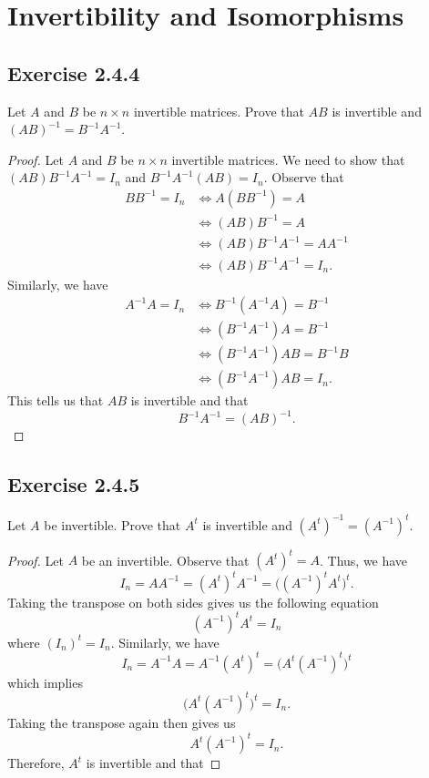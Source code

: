 \section{Invertibility and Isomorphisms}

\subsection*{Exercise 2.4.4} Let \( A  \) and \( B  \) be \( n \times n  \) invertible matrices. Prove that \( AB  \) is invertible and \( (AB)^{-1} = B^{-1} A^{-1} \).
\begin{proof}
Let \( A  \) and \( B  \) be \( n \times n  \) invertible matrices. We need to show that \( (AB)B^{-1}A^{-1} = {I}_{n} \) and \( B^{-1} A^{-1} (AB) = {I}_{n} \). Observe that
\begin{align*}
    B B^{-1} = {I}_{n}   &\iff A(B B^{-1}) = A   \\
                         &\iff  (AB) B^{-1} = A  \\
                         &\iff (AB) B^{-1}A^{-1} = A A^{-1} \\ 
                         &\iff (AB) B^{-1} A^{-1} = {I}_{n}.
\end{align*}
Similarly, we have 
\begin{align*}
     A^{-1} A  = {I}_{n} &\iff B^{-1}(A^{-1} A ) = B^{-1}  \\
                         &\iff (B^{-1} A^{-1}) A = B^{-1} \\ 
                         &\iff (B^{-1} A^{-1}) AB = B^{-1}B \\
                         &\iff (B^{-1}A^{-1}) AB = {I}_{n}.
\end{align*}
This tells us that \( AB  \) is invertible and that  
\[  B^{-1}A^{-1} = (AB)^{-1}. \]
\end{proof}

\subsection*{Exercise 2.4.5} Let \( A  \) be invertible. Prove that \( A^{t}  \) is invertible and \( (A^{t})^{-1} = (A^{-1})^{t} \).
\begin{proof}
Let \( A   \) be an invertible. Observe that \( (A^{t})^{t} = A  \). Thus, we have
\[  {I}_{n} = A A^{-1} = (A^{t})^{t} A^{-1} = \Big( (A^{-1})^{t} A^{t} \Big)^{t}. \]
Taking the transpose on both sides gives us the following equation
\[  (A^{-1})^{t} A^{t} = {I}_{n} \] where \( ({I}_{n})^{t} = {I}_{n} \).
Similarly, we have
\[  {I}_{n} =  A^{-1} A = A^{-1} (A^{t})^{t} = \Big( A^{t} (A^{-1})^{t} \Big)^{t}  \]
which implies
\[ \Big( A^{t} (A^{-1})^{t} \Big)^{t} = {I}_{n}.  \]
Taking the transpose again then gives us
\[  A^{t} (A^{-1})^{t} = {I}_{n}. \]
Therefore, \( A^{t} \) is invertible and that 
\end{proof}

